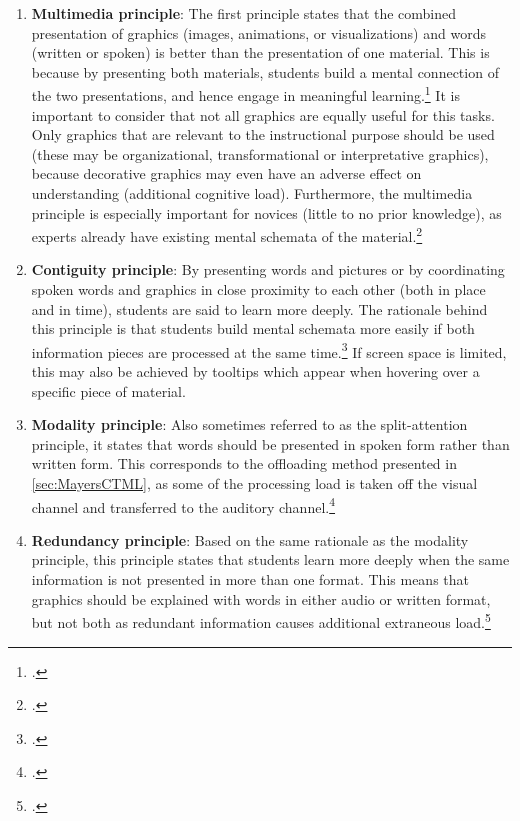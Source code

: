 \begin{enumerate}
    \item \textbf{Multimedia principle}: The first principle states that the combined presentation of graphics (images, animations, or visualizations) and words (written or spoken) is better than the presentation of one material. This is because by presenting both materials, students build a mental connection of the two presentations, and hence engage in meaningful learning.\footcites[Cf.][p.19]{MayerAnimationAidMultimedia2001}[cf.][chapter 4, paragraph 7]{ClarkElearningscienceinstruction2016}[cf.][p.13]{MayerCognitiveTheoryMultimedia1999} It is important to consider that not all graphics are equally useful for this tasks. Only graphics that are relevant to the instructional purpose should be used (these may be organizational, transformational or interpretative graphics), because decorative graphics may even have an adverse effect on understanding (additional cognitive load). Furthermore, the multimedia principle is especially important for novices (little to no prior knowledge), as experts already have existing mental schemata of the material.\footcites[Cf.][chapter 4, paragraphs 7 et seq]{ClarkElearningscienceinstruction2016}[cf. in addition][]{MayerWhenillustrationworth1990}
    \item \textbf{Contiguity principle}: By presenting words and pictures or by coordinating spoken words and graphics in close proximity to each other (both in place and in time), students are said to learn more deeply. The rationale behind this principle is that students build mental schemata more easily if both information pieces are processed at the same time.\footcites[Cf.][pp. 19 et seq]{MayerAnimationAidMultimedia2001}[cf.][chapter 5, paragraphs 1 et seq.]{ClarkElearningscienceinstruction2016} If screen space is limited, this may also be achieved by tooltips which appear when hovering over a specific piece of material.
    \item \textbf{Modality principle}: Also sometimes referred to as the split-attention principle, it states that words should be presented in spoken form rather than written form. This corresponds to the offloading method presented in \ref{sec:MayersCTML}, as some of the processing load is taken off the visual channel and transferred to the auditory channel.\footcites[Cf.][p.22]{MayerAnimationAidMultimedia2001}[cf.][p.14]{MayerCognitiveTheoryMultimedia1999}
    \item \textbf{Redundancy principle}: Based on the same rationale as the modality principle, this principle states that students learn more deeply when the same information is not presented in more than one format. This means that graphics should be explained with words in either audio or written format, but not both as redundant information causes additional extraneous load.\footcites[Cf.][chapters 6 and 7]{ClarkElearningscienceinstruction2016}[cf.][p.6]{MayerMultimediaLearning2009}[cf.][p.22]{MayerAnimationAidMultimedia2001}[cf. in addition][]{MayerPrinciplesreducingextraneous2014}

\end{enumerate}
